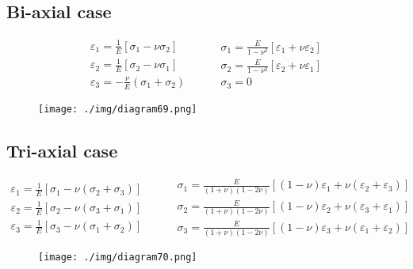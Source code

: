 \subsection{Bi-axial case}
\begin{equation}
  \begin{array}{l}
    \varepsilon_1 = \frac{1}{E}\left[\sigma_1-\nu\sigma_2\right] \\
    \varepsilon_2 = \frac{1}{E}\left[\sigma_2-\nu\sigma_1\right] \\
    \varepsilon_3 =-\frac{\nu}{E}\left(\sigma_1 + \sigma_2\right)
  \end{array} \hspace{1cm} \begin{array}{l}
    \sigma_1 = \frac{E}{1-\nu^2}\left[\varepsilon_1 + \nu \varepsilon_2\right] \\
    \sigma_2 = \frac{E}{1-\nu^2}\left[\varepsilon_2 + \nu \varepsilon_1\right] \\
    \sigma_3 = 0
  \end{array}
\end{equation}
\begin{figure}[H]
  \centering
  \texttt{[image: ./img/diagram69.png]}
  \caption{}
\end{figure}
\subsection{Tri-axial case}
\begin{equation}
  \begin{array}{l}
    \varepsilon_1 = \frac{1}{E}\left[\sigma_1-\nu\left(\sigma_2 + \sigma_3\right)\right] \\
    \varepsilon_2 = \frac{1}{E}\left[\sigma_2-\nu\left(\sigma_3 + \sigma_1\right)\right] \\
    \varepsilon_3 = \frac{1}{E}\left[\sigma_3-\nu\left(\sigma_1 + \sigma_2\right)\right]
  \end{array} \hspace{1cm} \begin{array}{l}
    \sigma_1 = \frac{E}{\left(1+\nu\right)\left(1-2\nu\right)}\left[\left(1-\nu\right)\varepsilon_1 + \nu \left(\varepsilon_2 + \varepsilon_3\right)\right] \\
    \sigma_2 = \frac{E}{\left(1+\nu\right)\left(1-2\nu\right)}\left[\left(1-\nu\right)\varepsilon_2 + \nu \left(\varepsilon_3 + \varepsilon_1\right)\right] \\
    \sigma_3 = \frac{E}{\left(1+\nu\right)\left(1-2\nu\right)}\left[\left(1-\nu\right)\varepsilon_3 + \nu \left(\varepsilon_1 + \varepsilon_2\right)\right]
  \end{array}
\end{equation}
\begin{figure}[H]
  \centering
  \texttt{[image: ./img/diagram70.png]}
  \caption{}
\end{figure}